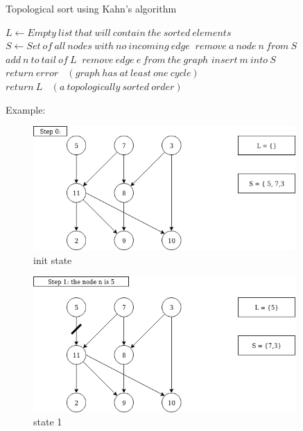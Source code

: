 \documentclass[12pt]{article}
\begin{document}
\begin{algorithm}

  \caption{Topological sort using Kahn's algorithm  \cite{1}}
  
  \begin{algorithmic}[1]
    \Statex
        \State $L \gets Empty\ list\ that\ will\ contain\ the\ sorted\ elements $
        \State $S \gets Set\ of\ all\ nodes\ with\ no\ incoming\ edge\ $
            \State $remove\ a\ node\ n\ from\ S\ $
            \State $add\ n\ to\ tail\ of\ L\ $
                \State $remove\ edge\ e\ from\ the\ graph$
                    \State $insert\ m\ into\ S$
                \EndIf
            \EndFor
        \EndWhile
            \State $return\ error\  \ \ \ (graph\ has\ at\ least\ one\ cycle)$
        \Else
        \State $return\ L\  \ \ \ (a\ topologically\ sorted\ order)$
        \EndIf
  \end{algorithmic}
 
\end{algorithm}

Example:
\begin{figure}[H]
\centering
\includegraphics[width=100mm]{khanAlgoStep1.png}
\caption{init state}
\end{figure}

\begin{figure}[H]
\centering
\includegraphics[width=100mm]{khanAlgoStep2.png}
\caption{state 1}
\end{figure}
\end{document}
